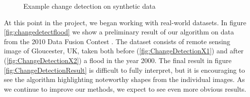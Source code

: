 \documentclass{article}[11pt]
\begin{document}
\begin{figure}
  \centering
  \hfill %
  \hfill %
  \caption{Example change detection on synthetic data}
  \label{fig:changedetectsynthetic}
\end{figure}

At this point in the project, we began working with real-world datasets. In
figure \ref{fig:changedetectflood} we show a preliminary result of our algorithm
on data from the 2010 Data Fusion Contest \cite{longbotham2012multi}. The
dataset consists of remote sensing image of Gloucester, UK, taken both before
(\ref{fig:ChangeDetectionX1}) and after (\ref{fig:ChangeDetectionX2}) a flood in
the year 2000. The final result in figure \ref{fig:ChangeDetectionResult} is
difficult to fully interpret, but it is encouraging to see the algorithm
highlighting noteworthy shapes from the individual images. As we continue to
improve our methods, we expect to see even more obvious results.
\end{document}
